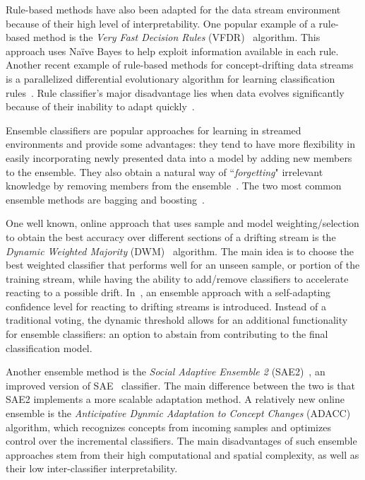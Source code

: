 \documentclass[reqno]{vcuthesis}
\numberwithin{equation}{chapter}
\begin{document}
Rule-based methods have also been adapted for the data stream environment because of their high level of interpretability. One popular example of a rule-based method is the \textit{Very Fast Decision Rules} (VFDR)~\cite{gama2011learning} algorithm. This approach uses Na\"{i}ve Bayes to help exploit information available in each rule. Another recent example of rule-based methods for concept-drifting data streams is a parallelized differential evolutionary algorithm for learning classification rules~\cite{canokrawczyk2018}. Rule classifier's major disadvantage lies when data evolves significantly because of their inability to adapt quickly~\cite{ditzler2015learning}. 

\newpage
Ensemble classifiers are popular approaches for learning in streamed environments and provide some advantages: they tend to have more flexibility in easily incorporating newly presented data into a model by adding new members to the ensemble. They also obtain a natural way of ``\textit{forgetting}" irrelevant knowledge by removing members from the ensemble~\cite{ditzler2015learning}. The two most common ensemble methods are bagging and boosting~\cite{oza2001onlinebb}. 

One well known, online approach that uses sample and model weighting/selection to obtain the best accuracy over different sections of a drifting stream is the \textit{Dynamic Weighted Majority} (DWM)~\cite{kolter2007dynamic} algorithm. The main idea is to choose the best weighted classifier that performs well for an unseen sample, or portion of the training stream, while having the ability to add/remove classifiers to accelerate reacting to a possible drift. In~\cite{2018krawczykcano}, an ensemble approach with a self-adapting confidence level for reacting to drifting streams is introduced. Instead of a traditional voting, the dynamic threshold allows for an additional functionality for ensemble classifiers: an option to abstain from contributing to the final classification model.

Another ensemble method is the \textit{Social Adaptive Ensemble 2} (SAE2)~\cite{gomes2014sae2}, an improved version of SAE~\cite{gomes2013sae} classifier. The main difference between the two is that SAE2 implements a more scalable adaptation method. A relatively new online ensemble is the \textit{Anticipative Dynmic Adaptation to Concept Changes} (ADACC)~\cite{jaber2013new} algorithm, which recognizes concepts from incoming samples and optimizes control over the incremental classifiers. The main disadvantages of such ensemble approaches stem from their high computational and spatial complexity, as well as their low inter-classifier interpretability.
\end{document}
